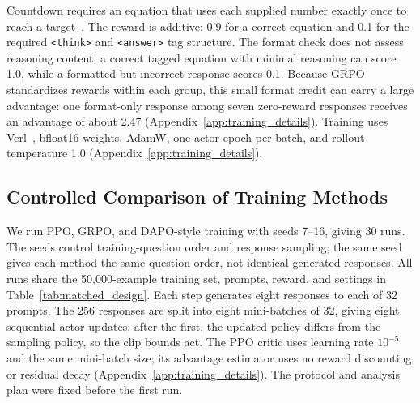 \documentclass[ai,article,submit,oneauthor]{Definitions/mdpi}
\begin{document}
Countdown requires an equation that uses each supplied number exactly once to reach a target~\cite{CountdownTasks3to4}. The reward is additive: 0.9 for a correct equation and 0.1 for the required \texttt{<think>} and \texttt{<answer>} tag structure. The format check does not assess reasoning content: a correct tagged equation with minimal reasoning can score 1.0, while a formatted but incorrect response scores 0.1. Because GRPO standardizes rewards within each group, this small format credit can carry a large advantage: one format-only response among seven zero-reward responses receives an advantage of about 2.47 (Appendix~\ref{app:training_details}). Training uses Verl~\cite{sheng2024hybridflow}, bfloat16 weights, AdamW, one actor epoch per batch, and rollout temperature 1.0 (Appendix~\ref{app:training_details}).

\subsection{Controlled Comparison of Training Methods}\label{sec:matched_design}

We run PPO, GRPO, and DAPO-style training with seeds 7--16, giving 30 runs. The seeds control training-question order and response sampling; the same seed gives each method the same question order, not identical generated responses. All runs share the 50,000-example training set, prompts, reward, and settings in Table~\ref{tab:matched_design}. Each step generates eight responses to each of 32 prompts. The 256 responses are split into eight mini-batches of 32, giving eight sequential actor updates; after the first, the updated policy differs from the sampling policy, so the clip bounds act. The PPO critic uses learning rate $10^{-5}$ and the same mini-batch size; its advantage estimator uses no reward discounting or residual decay (Appendix~\ref{app:training_details}). The protocol and analysis plan were fixed before the first run.
\end{document}
